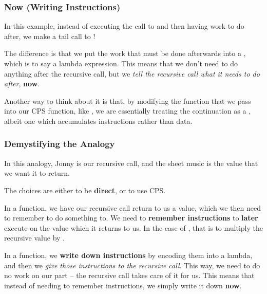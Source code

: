 \documentclass[aspectratio=169, handout]{beamer}
\begin{document}
\begin{frame}[fragile]
  \frametitle{Now (Writing Instructions)}

  In this example, instead of executing the call to 
  and then having work to do after, we make a tail call to !

  \pause
  \vspace{\fill}

  The difference is that we put the work that must be done afterwards 
  into a , which is to say a lambda expression. This
  means that we don't need to do anything after the recursive call, but
  we \textit{tell the recursive call what it needs to do after}, \textbf{now}.

  \pause
  \vspace{\fill}

  Another way to think about it is that, by modifying the function that
  we pass into our CPS function, like , we are essentially
  treating the continuation as a , albeit
  one which accumulates instructions rather than data.
\end{frame}

\begin{frame}[fragile]
  \frametitle{Demystifying the Analogy}

  In this analogy, Jonny is our recursive call, and the sheet music is the
  value that we want it to return.

  \pause
  \vspace{\fill}

  The choices are either to be \textbf{direct}, or to use CPS.

  \pause
  \vspace{\fill}

  In a  function, we have our recursive call return to us a value,
  which we then need to remember to do something to. We need to \textbf{remember
  instructions} to \textbf{later} execute on the value which it returns to us.
  In the case of , that is to multiply the recursive value by .

  \pause
  \vspace{\fill}

  In a  function, we \textbf{write down instructions} by encoding them into
  a lambda, and then we \textit{give those instructions to the recursive call}.
  This way, we need to do no work on our part -- the recursive call takes care
  of it for us. This means that instead of needing to remember instructions,
  we simply write it down \textbf{now}.
\end{frame}
\end{document}
